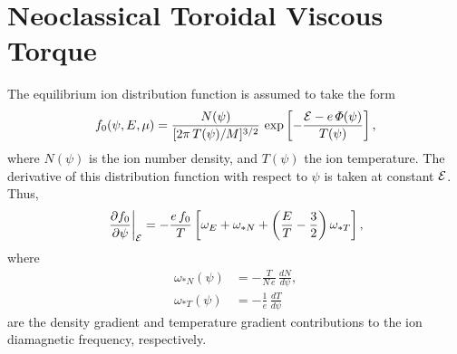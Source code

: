 \documentclass[12pt,prb,aps,notitlepage]{revtex4-1}
\begin{document}
\section{Neoclassical Toroidal Viscous Torque}
The equilibrium ion distribution function is assumed to take the form 
\begin{equation}
f_0(\psi,E,\mu) = \frac{N(\psi)}{[2\pi\,T(\psi)/M]^{3/2}}\,\exp\left[-\frac{{\cal E}-e\,{\mit\Phi}(\psi)}{T(\psi)}\right],
\end{equation} 
where $N(\psi)$ is the ion number density, and $T(\psi)$ the ion temperature. The derivative of this distribution function with respect to $\psi$ is
taken at constant ${\cal E}$. Thus, 
\begin{equation}\label{e128a}
\left.\frac{\partial f_0}{\partial\psi}\right|_{\cal E}= -\frac{e\,f_0}{T}\left[\omega_E +\omega_{\ast N}+ \left(\frac{E}{T}-\frac{3}{2}\right)\omega_{\ast T}\right],
\end{equation}
where
\begin{align}
\omega_{\ast N}(\psi)&= - \frac{T}{N\,e}\,\frac{dN}{d\psi},\\[0.5ex]
\omega_{\ast T}(\psi)&=-\frac{1}{e}\,\frac{dT}{d\psi}
\end{align}
are the density gradient and temperature gradient contributions to the ion diamagnetic frequency, respectively. 
\end{document}
